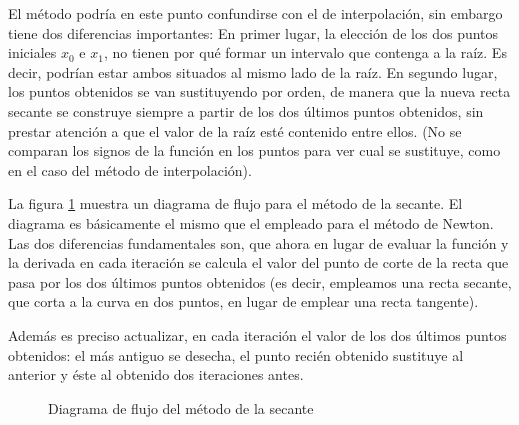 El método podría en este punto confundirse con el de interpolación, sin embargo tiene dos diferencias importantes: En primer lugar, la elección de los dos puntos iniciales $x_0$ e $x_1$, no tienen por qué formar un intervalo que contenga a la raíz. Es decir, podrían estar ambos situados al mismo lado de la raíz. En segundo lugar, los puntos obtenidos se van sustituyendo por orden, de manera que la nueva recta secante se construye siempre a partir de los dos últimos puntos obtenidos, sin prestar atención a que el valor de la raíz esté contenido entre ellos. (No se comparan los signos de la función en los puntos para ver cual se sustituye, como en el caso del método de interpolación). 

La figura \ref{fig:secante2} muestra un diagrama de flujo para el método de la secante. El diagrama es básicamente el mismo que el empleado para el método de Newton. Las dos diferencias fundamentales son, que ahora en lugar de evaluar la función y la derivada en cada iteración se calcula  el valor del punto de corte de la recta que pasa por los dos últimos puntos obtenidos (es decir, empleamos una recta secante, que corta a la curva en dos puntos, en lugar de emplear una recta tangente). 

Además es preciso actualizar, en cada iteración el valor de los dos últimos puntos obtenidos: el más antiguo se desecha, el punto recién obtenido sustituye al anterior y éste al obtenido dos iteraciones antes. 

\begin{figure}[h]
\centering
{}
\caption{Diagrama de flujo del método de la secante}
\label{fig:secante2}
\end{figure}

